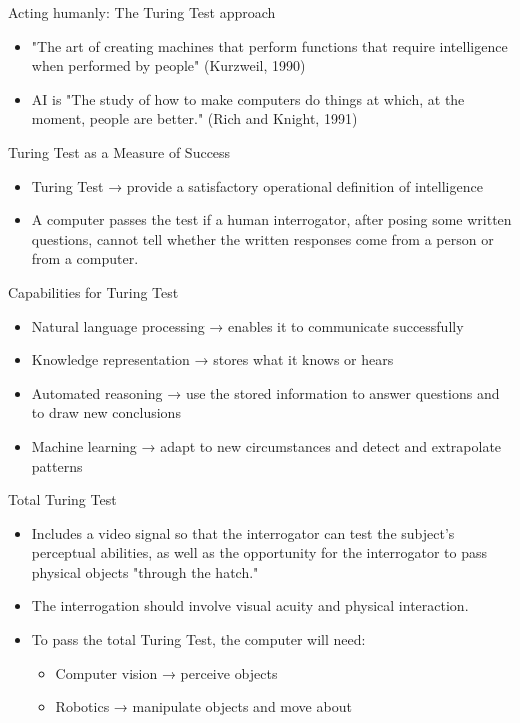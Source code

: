 \documentclass{beamer}
\begin{document}
\begin{frame}{Acting humanly: The Turing Test approach}
    \begin{itemize}
        \item "The art of creating machines that perform functions that require intelligence when performed by people" (Kurzweil, 1990)
        \item AI is "The study of how to make computers do things at which, at the moment, people are better." (Rich and Knight, 1991)
    \end{itemize}
\end{frame}

\begin{frame}{Turing Test as a Measure of Success}
    \begin{itemize}
        \item Turing Test → provide a satisfactory operational definition of intelligence
        \item A computer passes the test if a human interrogator, after posing some written questions, cannot tell whether the written responses come from a person or from a computer.
    \end{itemize}
\end{frame}

\begin{frame}{Capabilities for Turing Test}
    \begin{itemize}
        \item Natural language processing → enables it to communicate successfully
        \item Knowledge representation → stores what it knows or hears
        \item Automated reasoning → use the stored information to answer questions and to draw new conclusions
        \item Machine learning → adapt to new circumstances and detect and extrapolate patterns
    \end{itemize}
\end{frame}

\begin{frame}{Total Turing Test}
    \begin{itemize}
        \item Includes a video signal so that the interrogator can test the subject's perceptual abilities, as well as the opportunity for the interrogator to pass physical objects "through the hatch."
        \item The interrogation should involve visual acuity and physical interaction.
        \item To pass the total Turing Test, the computer will need:
        \begin{itemize}
            \item Computer vision → perceive objects
            \item Robotics → manipulate objects and move about
        \end{itemize}
    \end{itemize}
\end{frame}
\end{document}
